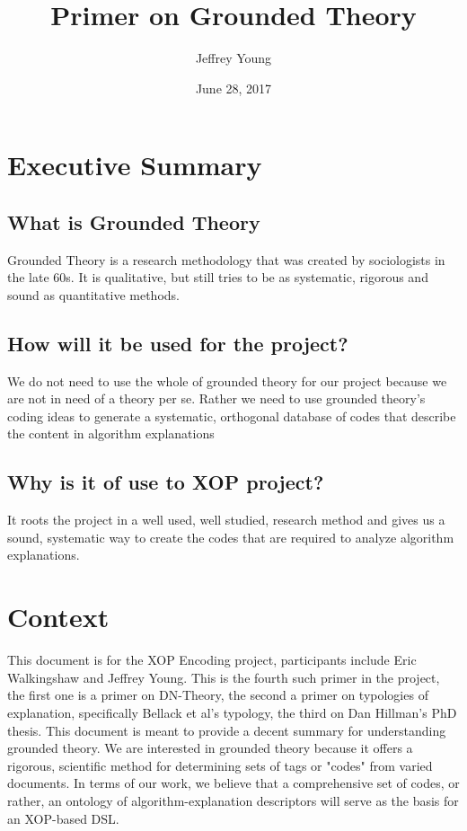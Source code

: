 \documentclass[10pt, letterpaper]{article}
\author{Jeffrey Young}
\date{June 28, 2017}
\title{Primer on Grounded Theory}
\begin{document}
\maketitle

\section*{Executive Summary}
\label{sec:org8d338cd}
\subsection*{What is Grounded Theory}
\label{sec:org2d6861c}
Grounded Theory is a research methodology that was created by sociologists in
the late 60s. It is qualitative, but still tries to be as systematic,
rigorous and sound as quantitative methods.

\subsection*{How will it be used for the project?}
\label{sec:org8662cd7}
We do not need to use the whole of grounded theory for our project because we
are not in need of a theory per se. Rather we need to use grounded theory's
coding ideas to generate a systematic, orthogonal database of codes that
describe the content in algorithm explanations

\subsection*{Why is it of use to XOP project?}
\label{sec:org5cf993e}
It roots the project in a well used, well studied, research method and
gives us a sound, systematic way to create the codes that are required to
analyze algorithm explanations.

\section*{Context}
\label{sec:org42b9ce7}
This document is for the XOP Encoding project, participants include Eric
Walkingshaw and Jeffrey Young. This is the fourth such primer in the project,
the first one is a primer on DN-Theory, the second a primer on typologies of
explanation, specifically Bellack et al's typology, the third on Dan Hillman's
PhD thesis. This document is meant to provide a decent summary for
understanding grounded theory. We are interested in grounded theory because it
offers a rigorous, scientific method for determining sets of tags or "codes"
from varied documents. In terms of our work, we believe that a comprehensive
set of codes, or rather, an ontology of algorithm-explanation descriptors will
serve as the basis for an XOP-based DSL.
\end{document}
